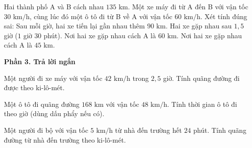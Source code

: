 \begin{ex} %
Hai thành phố A và B cách nhau $135\text{ km}$. Một xe máy đi từ A đến B với vận tốc $30\text{ km/h}$, cùng lúc đó một ô tô đi từ B về A với vận tốc $60\text{ km/h}$. Xét tính đúng sai:
\choiceTF
{\True Sau mỗi giờ, hai xe tiến lại gần nhau thêm $90\text{ km}$.}
{\True Hai xe gặp nhau sau $1{,}5$ giờ ($1$ giờ $30$ phút).}
{Nơi hai xe gặp nhau cách A là $60\text{ km}$.}
{\True Nơi hai xe gặp nhau cách A là $45\text{ km}$.}
\end{ex}

\textbf{Phần 3. Trả lời ngắn}

\begin{ex} %
Một người đi xe máy với vận tốc $42\text{ km/h}$ trong $2{,}5$ giờ. Tính quãng đường đi được theo ki-lô-mét.
\end{ex}

\begin{ex} %
Một ô tô đi quãng đường $168\text{ km}$ với vận tốc $48\text{ km/h}$. Tính thời gian ô tô đi theo giờ (dùng dấu phẩy nếu có).
\end{ex}

\begin{ex} %
Một người đi bộ với vận tốc $5\text{ km/h}$ từ nhà đến trường hết $24$ phút. Tính quãng đường từ nhà đến trường theo ki-lô-mét.
\end{ex}

